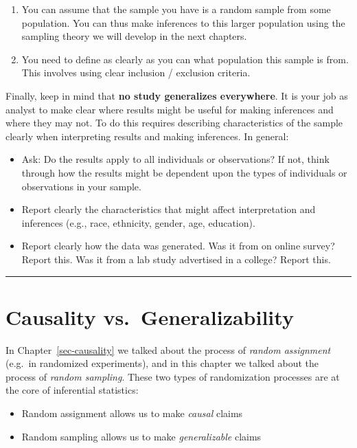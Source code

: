 \documentclass[
  letterpaper,
  DIV=11,
  numbers=noendperiod]{scrreprt}
\providecommand{\tightlist}{%
  \setlength{\itemsep}{0pt}\setlength{\parskip}{0pt}}\usepackage{longtable,booktabs,array}
\theoremstyle{definition}
\theoremstyle{remark}
\begin{document}
\begin{enumerate}
\def\labelenumi{\arabic{enumi}.}
\item
  You can assume that the sample you have is a random sample from some
  population. You can thus make inferences to this larger population
  using the sampling theory we will develop in the next chapters.
\item
  You need to define as clearly as you can what population this sample
  is from. This involves using clear inclusion / exclusion criteria.
\end{enumerate}

Finally, keep in mind that \textbf{no study generalizes everywhere}. It
is your job as analyst to make clear where results might be useful for
making inferences and where they may not. To do this requires describing
characteristics of the sample clearly when interpreting results and
making inferences. In general:

\begin{itemize}
\tightlist
\item
  Ask: Do the results apply to all individuals or observations? If not,
  think through how the results might be dependent upon the types of
  individuals or observations in your sample.
\item
  Report clearly the characteristics that might affect interpretation
  and inferences (e.g., race, ethnicity, gender, age, education).
\item
  Report clearly how the data was generated. Was it from on online
  survey? Report this. Was it from a lab study advertised in a college?
  Report this.
\end{itemize}

\begin{center}\rule{0.5\linewidth}{0.5pt}\end{center}

\hypertarget{causality-vs.-generalizability}{%
\section{Causality
vs.~Generalizability}\label{causality-vs.-generalizability}}

In Chapter~\ref{sec-causality} we talked about the process of
\emph{random assignment} (e.g.~in randomized experiments), and in this
chapter we talked about the process of \emph{random sampling}. These two
types of randomization processes are at the core of inferential
statistics:

\begin{itemize}
\tightlist
\item
  Random assignment allows us to make \emph{causal} claims
\item
  Random sampling allows us to make \emph{generalizable} claims
\end{itemize}
\end{document}
